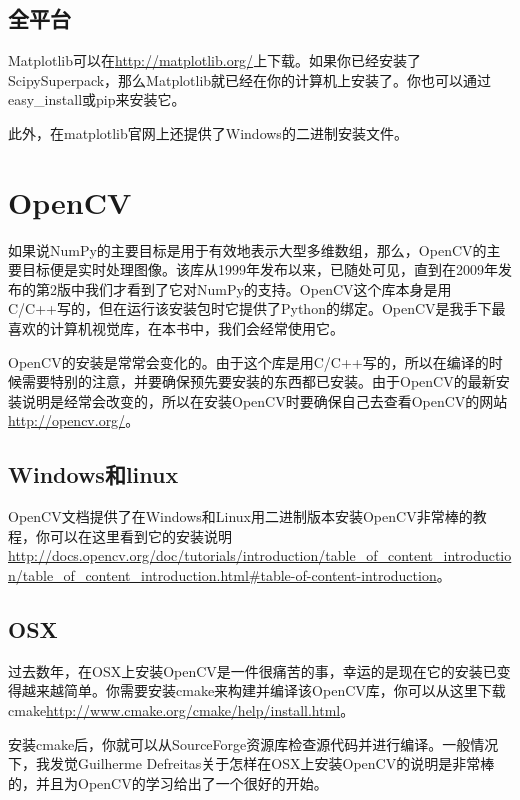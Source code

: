 \documentclass[color=cyan,mathpazo,titlestyle=hang]{elegantbook}
\begin{document}
\subsection{全平台}

Matplotlib可以在\url{http://matplotlib.org/}上下载。如果你已经安装了ScipySuperpack，那么Matplotlib就已经在你的计算机上安装了。你也可以通过easy\_install或pip来安装它。

此外，在matplotlib官网上还提供了Windows的二进制安装文件。

\section{OpenCV}

如果说NumPy的主要目标是用于有效地表示大型多维数组，那么，OpenCV的主要目标便是实时处理图像。该库从1999年发布以来，已随处可见，直到在2009年发布的第2版中我们才看到了它对NumPy的支持。OpenCV这个库本身是用C/C++写的，但在运行该安装包时它提供了Python的绑定。OpenCV是我手下最喜欢的计算机视觉库，在本书中，我们会经常使用它。

OpenCV的安装是常常会变化的。由于这个库是用C/C++写的，所以在编译的时候需要特别的注意，并要确保预先要安装的东西都已安装。由于OpenCV的最新安装说明是经常会改变的，所以在安装OpenCV时要确保自己去查看OpenCV的网站\url{http://opencv.org/}。

\subsection{Windows和linux}

OpenCV文档提供了在Windows和Linux用二进制版本安装OpenCV非常棒的教程，你可以在这里看到它的安装说明\url{http://docs.opencv.org/doc/tutorials/introduction/table_of_content_introduction/table_of_content_introduction.html#table-of-content-introduction}。

\subsection{OSX}

过去数年，在OSX上安装OpenCV是一件很痛苦的事，幸运的是现在它的安装已变得越来越简单。你需要安装cmake来构建并编译该OpenCV库，你可以从这里下载cmake\href{http://www.cmake.org/cmake/help/install.html}{http://www.cmake.org/cmake/help/install.html}。

安装cmake后，你就可以从SourceForge资源库检查源代码并进行编译。一般情况下，我发觉Guilherme Defreitas关于怎样在OSX上安装OpenCV的说明是非常棒的，并且为OpenCV的学习给出了一个很好的开始。
\end{document}
